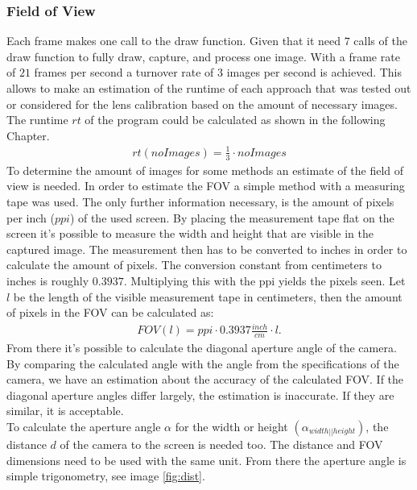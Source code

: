 \documentclass[journal,final,a4paper,twoside]{PS}
\begin{document}
\subsubsection{Field of View}
\label{sec:FOV}
Each frame makes one call to the draw function. Given that it need $7$ calls of the draw function to fully draw, capture, and process one image. With a frame rate of $21$ frames per second a turnover rate of $3$ images per second is achieved. This allows to make an estimation of the runtime of each approach that was tested out or considered for the lens calibration based on the amount of necessary images. The runtime $rt$ of the program could be calculated as shown in the following Chapter. 
\begin{align}
rt(noImages) = \frac{1}{3} \cdot noImages 
\end{align}
To determine the amount of images for some methods an estimate of the field of view is needed. In order to estimate the FOV a simple method with a measuring tape was used. The only further information necessary, is the amount of pixels per inch ($ppi$) of the used screen. By placing the measurement tape flat on the screen it's possible to measure the width and height that are visible in the captured image. The measurement then has to be converted to inches in order to calculate the amount of pixels. The conversion constant from centimeters to inches is roughly $0.3937$. Multiplying this with the ppi yields the pixels seen. Let $l$ be the length of the visible measurement tape in centimeters, then the amount of pixels in the FOV can be calculated as:
\begin{align}
FOV(l) = ppi \cdot 0.3937 \frac{inch}{cm} \cdot l .
\end{align}
From there it's possible to calculate the diagonal aperture angle of the camera. By comparing the calculated angle with the angle from the specifications of the camera, we have an estimation about the accuracy of the calculated FOV. If the diagonal aperture angles differ largely, the estimation is inaccurate. If they are similar, it is acceptable.\\
To calculate the aperture angle $\alpha$ for the width or height $\left( \alpha_{width||height}\right)$, the distance $d$ of the camera to the screen is needed too. The distance and FOV dimensions need to be used with the same unit. From there the aperture angle is simple trigonometry, see image \ref{fig:dist}.
\end{document}

